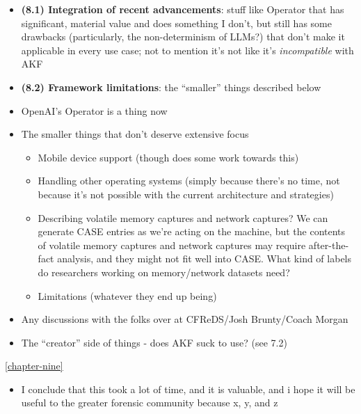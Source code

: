 \begin{itemize}
\item
  \textbf{(8.1) Integration of recent advancements}: stuff like Operator
  that has significant, material value and does something I don't, but
  still has some drawbacks (particularly, the non-determinism of LLMs?)
  that don't make it applicable in every use case; not to mention it's
  not like it's \emph{incompatible} with AKF
\item
  \textbf{(8.2) Framework limitations}: the ``smaller'' things described
  below
\item
  OpenAI's Operator is a thing now
\item
  The smaller things that don't deserve extensive focus

  \begin{itemize}
  \tightlist
  \item
    Mobile device support (though
    \cite{demmelDataSynthesisGoing2024} does some work towards this)
  \item
    Handling other operating systems (simply because there's no time,
    not because it's not possible with the current architecture and
    strategies)
  \item
    Describing volatile memory captures and network captures? We can
    generate CASE entries as we're acting on the machine, but the
    contents of volatile memory captures and network captures may
    require after-the-fact analysis, and they might not fit well into
    CASE. What kind of labels do researchers working on memory/network
    datasets need?
  \item
    Limitations (whatever they end up being)
  \end{itemize}
\item
  Any discussions with the folks over at CFReDS/Josh Brunty/Coach Morgan
\item
  The ``creator'' side of things - does AKF suck to use? (see 7.2)
\end{itemize}

\autoref{chapter-nine}

\begin{itemize}
\tightlist
\item
  I conclude that this took a lot of time, and it is valuable, and i
  hope it will be useful to the greater forensic community because x, y,
  and z
\end{itemize}
